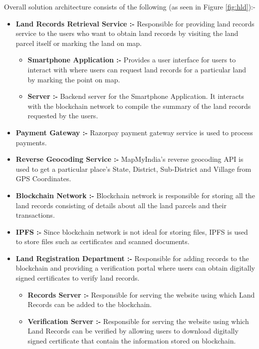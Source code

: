 \documentclass{article}
\begin{document}
    Overall solution architecture consists of the following (as seen in Figure \ref{fig:hld}):-
    \begin{itemize}
        \item \textbf{Land Records Retrieval Service :-} Responsible for providing land records service to the users who want to obtain land records by visiting the land parcel itself or marking the land on map.
        \begin{itemize}
            \item \textbf{Smartphone Application :-} Provides a user interface for users to interact with where users can request land records for a particular land by marking the point on map.
            \item \textbf{Server :-} Backend server for the Smartphone Application. It interacts with the blockchain network to compile the summary of the land records requested by the users.
        \end{itemize}
        \item \textbf{Payment Gateway :-} Razorpay payment gateway service is used to process payments.
        \item \textbf{Reverse Geocoding Service :-} MapMyIndia's reverse geocoding API is used to get a particular place's State, District, Sub-District and Village from GPS Coordinates.
        \item \textbf{Blockchain Network :-} Blockchain network is responsible for storing all the land records consisting of details about all the land parcels and their transactions.
        \item \textbf{IPFS :-} Since blockchain network is not ideal for storing files, IPFS is used to store files such as certificates and scanned documents.
        \item \textbf{Land Registration Department :-} Responsible for adding records to the blockchain and providing a verification portal where users can obtain digitally signed certificates to verify land records.
        \begin{itemize}
            \item \textbf{Records Server :-} Responsible for serving the website using which Land Records can be added to the blockchain.
            \item \textbf{Verification Server :-} Responsible for serving the website using which Land Records can be verified by allowing users to download digitally signed certificate that contain the information stored on blockchain.
        \end{itemize}  
    \end{itemize}
\end{document}
